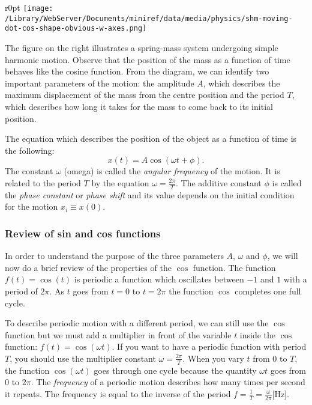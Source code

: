 \documentclass[letterpaper,9pt,journal]{IEEEtran}
\newcommand{\be}{\begin{equation}}
\newcommand{\ee}{\end{equation}}
\begin{document}

\begin{wrapfigure}{r}{0pt}
\texttt{[image: /Library/WebServer/Documents/miniref/data/media/physics/shm-moving-dot-cos-shape-obvious-w-axes.png]}
\end{wrapfigure}

\noindent
The figure on the right illustrates a spring-mass system undergoing simple harmonic motion. 
Observe that the position of the mass as a function of time behaves like the cosine function. 
From the diagram, we can identify two important parameters of the motion:  the amplitude $A$, 
which describes the maximum displacement of the mass from the centre position
and the period $T$, which describes how long it takes for the mass to come back to its initial position.

The equation which describes the position of the object as a function of time is the following:  
\be
 x(t)=A\cos(\omega t   + \phi).
 \label{SHM-x}
\ee
The constant $\omega$ (omega) is called the \emph{angular frequency} of the motion.
It is related to the period $T$ by the equation $\omega = \frac{2\pi}{T}$.
The additive constant $\phi$ is called the \emph{phase constant} or \emph{phase shift}
and its value depends on the initial condition for the motion $x_i\equiv x(0)$.

\subsubsection{Review of sin and cos functions}
In order to understand the purpose of the three parameters $A$, $\omega$ and $\phi$,
we will now do a brief review of the properties of the $\cos$ function.
%
The function %
$f(t)=\cos(t)$ is periodic a function which oscillates between $-1$ and $1$ with a period of $2\pi$.
As $t$ goes from $t=0$ to $t=2\pi$ the function $\cos$ completes one full cycle.

To describe periodic motion with a different period, 
we can still use the $\cos$ function but we must add 
a multiplier in front of the variable $t$ inside the $\cos$ function: 
$f(t) = \cos(\omega t )$.
%
If you want to have a periodic function with period $T$,
you should use the multiplier constant $\omega = \frac{2\pi}{T}$.
When you vary $t$ from $0$ to $T$, the function $\cos(\omega t )$
goes through one cycle because the quantity $\omega t$ goes from $0$ to $2\pi$.
The \emph{frequency} of a periodic motion describes how many times per second it repeats. 
The frequency is equal to the inverse of the period $f=\frac{1}{T}=\frac{\omega}{2\pi}$[Hz].
\end{document}
